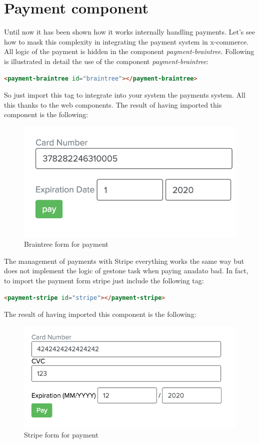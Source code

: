 \section{Payment component}
\label{sec:payment_component}
Until now it has been shown how it works internally handling payments. Let's see how to mask this complexity in integrating the payment system in x-commerce.
\newline
All logic of the payment is hidden in the component \emph{payment-braintree}.
\newline
Following is illustrated in detail the use of the component \emph{payment-braintree}:
\begin{lstlisting}[language=html]
<payment-braintree id="braintree"></payment-braintree>
\end{lstlisting}
So just import this tag to integrate into your system the payments system. All this thanks to the web components.
\newline
The result of having imported this component is the following:
\begin{figure}[htb]
 \centering
 \includegraphics[width=0.8\linewidth]{images/chapter5/braintree1.png}\hfill
 \caption[Braintree form]{Braintree form for payment}
 \label{fig:brintree_form1}
\end{figure}
The management of payments with Stripe everything works the same way but does not implement the logic of gestone task when paying anadato bad. In fact, to import the payment form stripe just include the following tag:
\begin{lstlisting}[language=html]
<payment-stripe id="stripe"></payment-stripe>
\end{lstlisting}
The result of having imported this component is the following:
\begin{figure}[htb]
 \centering
 \includegraphics[width=0.8\linewidth]{images/chapter5/stripe1.png}\hfill
 \caption[Stripe form]{Stripe form for payment}
 \label{fig:brintree_form1}
\end{figure}